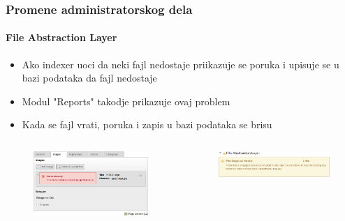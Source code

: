 \begin{frame}[fragile]
	\frametitle{Promene administratorskog dela}
	\framesubtitle{File Abstraction Layer}

	\begin{itemize}
		\item Ako indexer uoci da neki fajl nedostaje priikazuje se poruka i upisuje se u bazi podataka da fajl nedostaje
		\item Modul "Reports" takodje prikazuje ovaj problem
		\item Kada se fajl vrati, poruka i zapis u bazi podataka se brisu
	\end{itemize}

	\begin{columns}[T]

		\begin{column}{.5\textwidth}
			\begin{figure}
				\includegraphics[width=0.95\linewidth]{Images/BackendChanges/FalMissingFileContentElement.png}
			\end{figure}
		\end{column}

		\begin{column}{.5\textwidth}
			\begin{figure}
				\includegraphics[width=0.95\linewidth]{Images/BackendChanges/FalMissingFileReportsModule.png}
			\end{figure}
		\end{column}

	\end{columns}

\end{frame}

